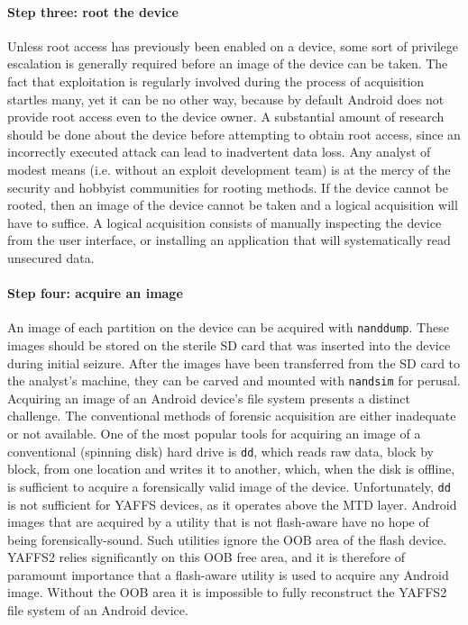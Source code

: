 \paragraph{Step three: root the device}
Unless root access has previously been enabled on a device, some sort of privilege escalation is generally required before an image
of the device can be taken. The fact that exploitation is regularly involved during the process of acquisition startles many, yet it
can be no other way, because by default Android does not provide root access even to the device owner.  A substantial amount of
research should be done about the device before attempting to obtain root access, since an incorrectly executed attack can lead to
inadvertent data loss. Any analyst of modest means (i.e. without an exploit development team) is at the mercy of the security and
hobbyist communities for rooting methods. If the device cannot be rooted, then an image of the device cannot be taken and a logical
acquisition will have to suffice. A logical acquisition consists of manually inspecting the device from the user interface, or
installing an application that will systematically read unsecured data.

\paragraph{Step four: acquire an image}
An image of each partition on the device can be acquired with \texttt{nanddump}.  These images should be stored on the sterile SD
card that was inserted into the device during initial seizure.  After the images have been transferred from the SD card to the
analyst's machine, they can be carved and mounted with \texttt{nandsim} for perusal.  Acquiring an image of an Android device's
file system presents a distinct challenge.  The conventional methods of forensic acquisition are either inadequate or not available.
One of the most popular tools for acquiring an image of a conventional (spinning disk) hard drive is \texttt{dd}, which reads raw
data, block by block, from one location and writes it to another, which, when the disk is offline, is sufficient to acquire a
forensically valid image of the device.  Unfortunately, \texttt{dd} is not sufficient for YAFFS devices, as it operates above the
MTD layer. Android images that are acquired by a utility that is not flash-aware have no hope of being forensically-sound. Such
utilities ignore the OOB area of the flash device. YAFFS2 relies significantly on this OOB free area, and it is therefore of
paramount importance that a flash-aware utility is used to acquire any Android image.  Without the OOB area it is impossible to
fully reconstruct the YAFFS2 file system of an Android device.

